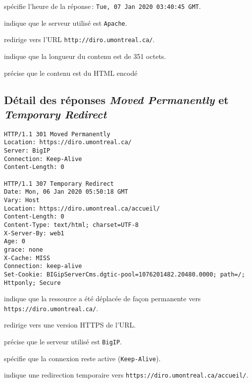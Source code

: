 \documentclass[a4paper]{report}
\begin{document}
\noindent{} spécifie l’heure de la réponse : \texttt{Tue, 07 Jan 2020 03:40:45 GMT}.  

\noindent{} indique que le serveur utilisé est \texttt{Apache}.  

\noindent{} redirige vers l’URL \texttt{http://diro.umontreal.ca/}.  

\noindent{} indique que la longueur du contenu est de 351 octets.  

\noindent{} précise que le contenu est du HTML encodé 

\subsection{Détail des réponses \emph{Moved Permanently} et \emph{Temporary Redirect}}
\begin{verbatim}
HTTP/1.1 301 Moved Permanently
Location: https://diro.umontreal.ca/
Server: BigIP
Connection: Keep-Alive
Content-Length: 0

HTTP/1.1 307 Temporary Redirect
Date: Mon, 06 Jan 2020 05:50:18 GMT
Vary: Host
Location: https://diro.umontreal.ca/accueil/
Content-Length: 0
Content-Type: text/html; charset=UTF-8
X-Server-By: web1
Age: 0
grace: none
X-Cache: MISS
Connection: keep-alive
Set-Cookie: BIGipServerCms.dgtic-pool=1076201482.20480.0000; path=/; Httponly; Secure
\end{verbatim}

\noindent{} indique que la ressource a été 
déplacée de façon permanente vers \texttt{https://diro.umontreal.ca/}.  

\noindent{} redirige vers une version HTTPS de l'URL.

\noindent{} précise que le serveur utilisé est \texttt{BigIP}.  

\noindent{} spécifie que la connexion reste active (\texttt{Keep-Alive}).  

\noindent{} indique une redirection temporaire 
vers \texttt{https://diro.umontreal.ca/accueil/}.  
\end{document}
